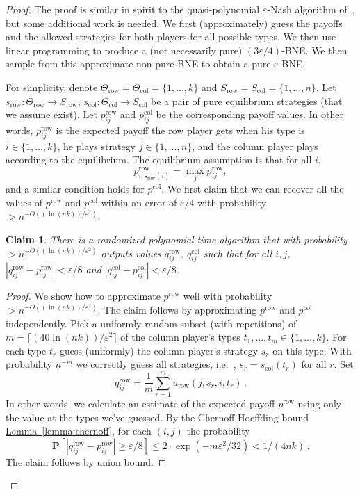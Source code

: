 \documentclass[10pt]{article}
\newtheorem{claim}[theorem]{Claim}
\theoremstyle{definition}
\providecommand{\ie}{i.e.\ }
\numberwithin{equation}{section}
\newcommand{\expref}[2]{\texorpdfstring{\hyperref[#2]{#1~\ref{#2}}}{#1~\ref{#2}}}
\newcommand{\eps}{\varepsilon}
\newcommand{\Ta}{\Theta}
\newcommand{\ra}{\rightarrow}
\begin{document}
\begin{proof}
The proof is similar in spirit to the quasi-polynomial $\eps$-Nash algorithm of~\cite{LMM03}, but some additional work 
is needed. We first (approximately) guess the payoffs and the allowed strategies for both players for all possible types. We then use linear programming to produce a (not necessarily pure) $(3\eps/4)$-BNE\@. We then sample from this approximate non-pure BNE to obtain a
pure $\eps$-BNE\@. 

For simplicity, denote $\Ta_{\mathrm{row}}=\Ta_\mathrm{col}=\{1,\ldots,k\}$ and $S_{\mathrm{row}}=S_\mathrm{col} = \{1,\ldots,n\}$. Let $s_{\mathrm{row}}:\Ta_{\mathrm{row}}\ra S_{\mathrm{row}}$, $s_\mathrm{col}:\Ta_\mathrm{col}\ra S_\mathrm{col}$ be 
a pair of pure equilibrium strategies (that we assume exist). Let $p^{\mathrm{row}}_{ij}$ and $p^\mathrm{col}_{ij}$ be the corresponding 
 payoff values. In other words, $p^{\mathrm{row}}_{ij}$ is the expected payoff the row player gets when his type is $i\in\{1,\ldots,k\}$, he plays strategy $j\in\{1,\ldots,n\}$, and the column player plays according to the equilibrium. The equilibrium assumption is that for all $i$,
 $$
 p^{\mathrm{row}}_{i,s_{\mathrm{row}}(i)} = \max_j p^{\mathrm{row}}_{ij},
 $$
 and a similar condition holds for $p^\mathrm{col}$. We first claim that we can recover all the values of $p^{\mathrm{row}}$ and $p^\mathrm{col}$ within 
 an error of $\eps/4$ with probability $>n^{-O((\ln (nk))/\eps^2)}$.
\begin{claim}
\label{cl:BNE1}
There is a randomized polynomial time algorithm that with probability $>n^{-O((\ln (nk))/\eps^2)}$ outputs values $q^{\mathrm{row}}_{ij}$, $q^\mathrm{col}_{ij}$ such that for all $i,j$, 
$|q^{\mathrm{row}}_{ij}-p^{\mathrm{row}}_{ij}|<\eps/8$ and $|q^\mathrm{col}_{ij}-p^\mathrm{col}_{ij}|<\eps/8$.
\end{claim}

\begin{proof}
We show how to approximate $p^{\mathrm{row}}$ well with probability $>n^{-O((\ln (nk))/\eps^2)}$. The claim follows by approximating $p^{\mathrm{row}}$ and $p^\mathrm{col}$ independently.
Pick a uniformly random subset (with repetitions) of $m=\lceil (40\ln (nk))/\eps^2\rceil$ of the column player's types $t_1,\ldots,t_m\in\{1,\ldots,k\}$. For each type $t_r$ guess (uniformly) the column player's strategy $s_r$ on this type. With probability $n^{-m}$ we correctly guess all strategies, \ie, $s_r = s_\mathrm{col}(t_r)$ for all $r$. Set 
$$
q^{\mathrm{row}}_{ij} = \frac{1}{m}\sum_{r=1}^{m} u_{\mathrm{row}}(j,s_r,i,t_r)\,.
$$
In other words, we calculate an estimate of the expected payoff $p^{\mathrm{row}}$ using only the value at the types we've guessed. By the Chernoff-Hoeffding bound \expref{Lemma}{lemma:chernoff}, for each $(i,j)$ the probability 
$$
{\mathbf P}[|q^{\mathrm{row}}_{ij}-p^{\mathrm{row}}_{ij}|\ge \eps/8] \le 2\cdot \exp(-m\eps^2/32) < 1/(4nk)\,.
$$
The claim follows by union bound. 
\end{proof}


\end{proof}
\end{document}
